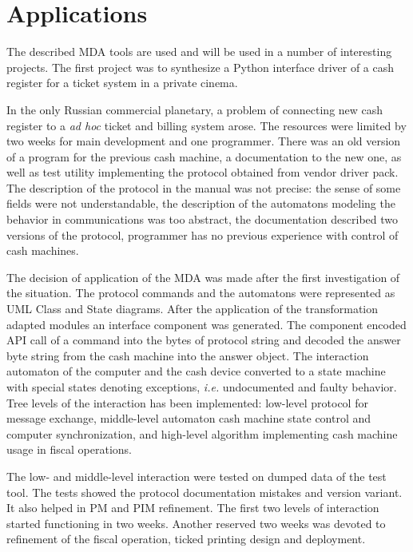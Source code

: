 \documentclass[conference,a4paper]{IEEEtran}
\begin{document}
\section{Applications}
\label{sec:app}

The described MDA tools are used and will be used in a number of interesting projects.  The first project was to synthesize a Python interface driver of a cash register for a ticket system in a private cinema.

In the only Russian commercial planetary, a problem of connecting new cash register to a \emph{ad hoc} ticket and billing system arose.  The resources were limited by two weeks for main development and one programmer.  There was an old version of a program for the previous cash machine, a documentation to the new one, as well as test utility implementing the protocol obtained from vendor driver pack.  The description of the protocol in the manual was not precise: the sense of some fields were not understandable, the description of the automatons modeling the behavior in communications was too abstract, the documentation described two versions of the protocol, programmer has no previous experience with control of cash machines.

The decision of application of the MDA was made after the first investigation of the situation.  The protocol commands and the automatons were represented as UML Class and State diagrams.  After the application of the transformation adapted modules an interface component was generated.  The component encoded API call of a command into the bytes of protocol string and decoded the answer byte string from the cash machine into the answer object.  The interaction automaton of the computer and the cash device converted to a state machine with special states denoting exceptions, \emph{i.e.} undocumented and faulty behavior.  Tree levels of the interaction has been implemented: low-level protocol for message exchange, middle-level automaton cash machine state control and computer synchronization, and high-level algorithm implementing cash machine usage in fiscal operations.

The low- and middle-level interaction were tested on dumped data of the test tool.  The tests showed the protocol documentation mistakes and version variant.  It also helped in PM and PIM refinement.  The first two levels of interaction started functioning in two weeks.  Another reserved two weeks was devoted to refinement of the fiscal operation, ticked printing design and deployment.
\end{document}
